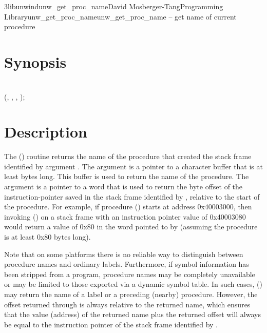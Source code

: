 \documentclass{article}
\begin{document}
\begin{Name}{3libunwind}{unw\_get\_proc\_name}{David Mosberger-Tang}{Programming Library}{unw\_get\_proc\_name}unw\_get\_proc\_name -- get name of current procedure
\end{Name}

\section{Synopsis}

\\

 (, ,  , );\\

\section{Description}

The () routine returns the name of the
procedure that created the stack frame identified by argument
.  The  argument is a pointer to a character buffer
that is at least  bytes long.  This buffer is used to return
the name of the procedure.  The  argument is a pointer to a
word that is used to return the byte offset of the instruction-pointer
saved in the stack frame identified by , relative to the start
of the procedure.  For example, if procedure () starts at
address 0x40003000, then invoking () on a
stack frame with an instruction pointer value of 0x40003080 would
return a value of 0x80 in the word pointed to by  (assuming
the procedure is at least 0x80 bytes long).

Note that on some platforms there is no reliable way to distinguish
between procedure names and ordinary labels.  Furthermore, if symbol
information has been stripped from a program, procedure names may be
completely unavailable or may be limited to those exported via a
dynamic symbol table.  In such cases, ()
may return the name of a label or a preceding (nearby) procedure.
However, the offset returned through  is always relative to
the returned name, which ensures that the value (address) of the
returned name plus the returned offset will always be equal to the
instruction pointer of the stack frame identified by .
\end{document}
